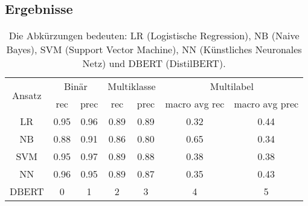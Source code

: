 \subsection{Ergebnisse}
\begin{table}[h]
    \centering
    \begin{tabular}{|c|c|c|c|c|c|c|}
        \hline
        \multirow{2}{*}{Ansatz} & \multicolumn{2}{c|}{Binär} & \multicolumn{2}{c|}{Multiklasse} & \multicolumn{2}{c|}{Multilabel} \\
        \cline{2-7}
        & rec & prec & rec & prec & macro avg rec & macro avg prec \\
        \hline
        LR & 0.95 & 0.96 & 0.89 & 0.89 & 0.32 & 0.44 \\
        \hline
        NB & 0.88 & 0.91 & 0.86 & 0.80 & 0.65 & 0.34 \\
        \hline
        SVM & 0.95 & 0.97 & 0.89 & 0.88 & 0.38 & 0.38 \\
        \hline
        NN & 0.96 & 0.95 & 0.89 & 0.87 & 0.35 & 0.43 \\
        \hline
        DBERT & 0 & 1 & 2 & 3 & 4 & 5 \\
        \hline
    \end{tabular}
    \caption{Die Abkürzungen bedeuten: LR (Logistische Regression), NB (Naive Bayes), SVM (Support Vector Machine), NN (Künstliches Neuronales Netz) und DBERT (DistilBERT).}
\end{table}
